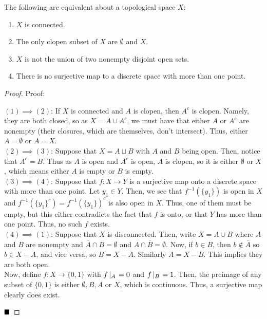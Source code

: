 \begin{lemma}
    The following are equivalent about a topological space $X$:
    \begin{enumerate}
        \item $X$ is connected.
        \item The only clopen subset of $X$ are $\emptyset$ and $X$.
        \item $X$ is not the union of two nonempty disjoint open sets.
        \item There is no surjective map to a discrete space with more than one point.
    \end{enumerate}
\end{lemma}
\begin{proof}{Proof:}
    
    $(1) \implies (2)$: If $X$ is connected and $A$ is clopen, then $A^{c}$ is clopen. Namely, they are both closed, so as $X = A \cup A^{c}$, we must have that either $A$ or $A^{c}$ are nonempty (their closures, which are themselves, don't intersect). Thus, either $A = \emptyset$ or $A = X$.\\

    $(2) \implies (3)$: Suppose that $X = A \sqcup B$ with $A$ and $B$ being open. Then, notice that $A^{c} = B$. Thus as $A$ is open and $A^{c}$ is open, $A$ is clopen, so it is either $\emptyset$ or $X$, which means either $A$ is empty or $B$ is empty.\\

    $(3) \implies (4)$: Suppose that $f : X \to Y$ is a surjective map onto a discrete space with more than one point. Let $y_1 \in Y$. Then, we see that $f^{-1}(\{y_1\})$ is open in $X$ and $f^{-1}(\{y_1\}^{c}) = f^{-1}(\{y_1\})^{c}$ is also open in $X$. Thus, one of them must be empty, but this either contradicts the fact that $f$ is onto, or that $Y$ has more than one point. Thus, no such $f$ exists.\\

    $(4) \implies (1)$: Suppose that $X$ is disconnected. Then, write $X = A \cup B$ where $A$ and $B$ are nonempty and $\overline{A} \cap B = \emptyset$ and $A \cap \overline{B} = \emptyset$. Now, if $b \in B$, then $b \notin \overline{A}$ so $b \in X - \overline{A}$, and vice versa, so $B = X - \overline{A}$. Similarly $A = X - \overline{B}$. This implies they are both open.\\

    Now, define $f : X \to \{0, 1\}$ with $f\left|_{A}\right. = 0$ and $f\left|_{B}\right. = 1$. Then, the preimage of any subset of $\{0, 1\}$ is either $\emptyset, B, A$ or $X$, which is continuous. Thus, a surjective map clearly does exist. 

    $\qed$
\end{proof}

